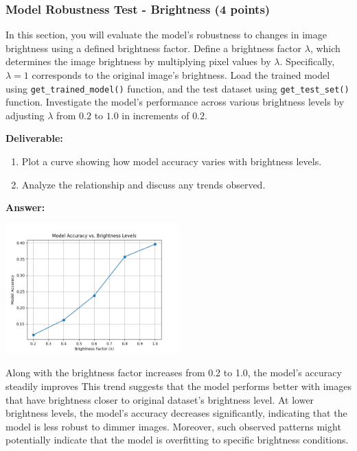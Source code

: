\documentclass[11pt, oneside]{article}   	%
\begin{document}
\subsubsection*{Model Robustness Test - Brightness (4 points)}
In this section, you will evaluate the model's robustness to changes in image brightness using a defined brightness factor.
Define a brightness factor $\lambda$, which determines the image brightness by multiplying pixel values by $\lambda$. Specifically, $\lambda = 1$ corresponds to the original image's brightness.
Load the trained model using \texttt{get\_trained\_model()} function, and the test dataset using \texttt{get\_test\_set()} function.  Investigate the model's performance across various brightness levels by adjusting $\lambda$ from $0.2$ to $1.0$ in increments of $0.2$. 

\noindent\textbf{Deliverable:}

\begin{enumerate}
    \item Plot a curve showing how model accuracy varies with brightness levels.
    \item Analyze the relationship and discuss any trends observed.
\end{enumerate}


\textbf{Answer:} 
\begin{center}
    \includegraphics[width=0.5\textwidth]{p2br_pic/Brightness_accuracy.png}
\end{center}
Along with the brightness factor increases from 0.2 to 1.0, the model's accuracy steadily improves
This trend suggests that the model performs better with images that have brightness closer to original dataset's brightness level.
At lower brightness levels, the model's accuracy decreases significantly, indicating that the model is less robust to dimmer images.
Moreover, such observed patterns might potentially indicate that the model is overfitting to specific brightness conditions.
\end{document}
